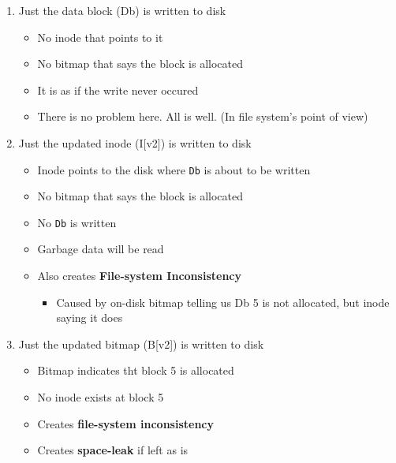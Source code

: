 \documentclass[12pt]{article}
\begin{document}
\begin{enumerate}[1)]
    \item Just the data block (Db) is written to disk

    \bigskip

    \begin{itemize}
        \item No inode that points to it
        \item No bitmap that says the block is allocated
        \item It is as if the write never occured
        \item There is no problem here. All is well. (In file system's point of view)
    \end{itemize}

    \bigskip

    \item Just the updated inode (I[v2]) is written to disk

    \bigskip

    \begin{itemize}
        \item Inode points to the disk where \texttt{Db} is about to be written
        \item No bitmap that says the block is allocated
        \item No \texttt{Db} is written
        \item Garbage data will be read
        \item Also creates \textbf{File-system Inconsistency}

        \begin{itemize}
            \item Caused by on-disk bitmap telling us Db 5 is not allocated,
            but inode saying it does
        \end{itemize}
    \end{itemize}

    \bigskip

    \item Just the updated bitmap (B[v2]) is written to disk

    \bigskip

    \begin{itemize}
        \item Bitmap indicates tht block 5 is allocated
        \item No inode exists at block 5
        \item Creates \textbf{file-system inconsistency}
        \item Creates \textbf{space-leak} if left as is


\end{itemize}
\end{enumerate}
\end{document}
